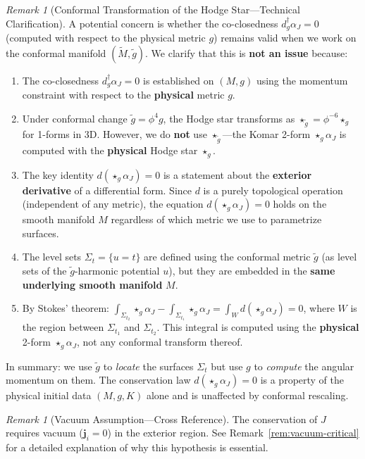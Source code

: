 \documentclass[12pt]{article}
\theoremstyle{plain}
\theoremstyle{definition}
\theoremstyle{remark}
\newtheorem{remark}[theorem]{Remark}
\newcommand{\momdens}{\boldsymbol{j}}
\begin{document}
\begin{remark}[Conformal Transformation of the Hodge Star---Technical Clarification]\label{rem:conformal-hodge}
A potential concern is whether the co-closedness $d^\dagger_g \alpha_J = 0$ (computed with respect to the physical metric $g$) remains valid when we work on the conformal manifold $(\tilde{M}, \tilde{g})$. We clarify that this is \textbf{not an issue} because:
\begin{enumerate}
    \item The co-closedness $d^\dagger_g \alpha_J = 0$ is established on $(M, g)$ using the momentum constraint with respect to the \textbf{physical} metric $g$.
    \item Under conformal change $\tilde{g} = \phi^4 g$, the Hodge star transforms as $\star_{\tilde{g}} = \phi^{-6} \star_g$ for 1-forms in 3D. However, we do \textbf{not} use $\star_{\tilde{g}}$---the Komar 2-form $\star_g \alpha_J$ is computed with the \textbf{physical} Hodge star $\star_g$.
    \item The key identity $d(\star_g \alpha_J) = 0$ is a statement about the \textbf{exterior derivative} of a differential form. Since $d$ is a purely topological operation (independent of any metric), the equation $d(\star_g \alpha_J) = 0$ holds on the smooth manifold $M$ regardless of which metric we use to parametrize surfaces.
    \item The level sets $\Sigma_t = \{u = t\}$ are defined using the conformal metric $\tilde{g}$ (as level sets of the $\tilde{g}$-harmonic potential $u$), but they are embedded in the \textbf{same underlying smooth manifold} $M$.
    \item By Stokes' theorem: $\int_{\Sigma_{t_2}} \star_g \alpha_J - \int_{\Sigma_{t_1}} \star_g \alpha_J = \int_W d(\star_g \alpha_J) = 0$, where $W$ is the region between $\Sigma_{t_1}$ and $\Sigma_{t_2}$. This integral is computed using the \textbf{physical} 2-form $\star_g \alpha_J$, not any conformal transform thereof.
\end{enumerate}
In summary: we use $\tilde{g}$ to \emph{locate} the surfaces $\Sigma_t$ but use $g$ to \emph{compute} the angular momentum on them. The conservation law $d(\star_g \alpha_J) = 0$ is a property of the physical initial data $(M, g, K)$ alone and is unaffected by conformal rescaling.
\end{remark}

\begin{remark}[Vacuum Assumption---Cross Reference]
The conservation of $J$ requires vacuum ($\momdens_i = 0$) in the exterior region. See Remark~\ref{rem:vacuum-critical} for a detailed explanation of why this hypothesis is essential.
\end{remark}
\end{document}
